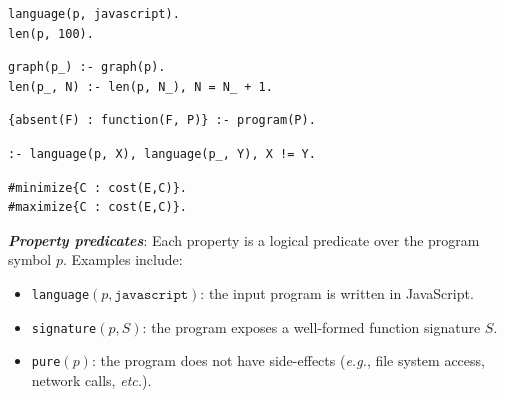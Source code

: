 \documentclass[nonacm,sigplan,review]{acmart}
\def\eg{{\em e.g.}, }
\def\etc{{\em etc.}\xspace}
\newcommand{\sys}{{\scshape Kv{\textalpha}sir}\xspace}
\newcommand{\heading}[1]{\vspace{2pt}\noindent\textbf{\emph{#1}}:\enspace}
\begin{document}
\begin{listing}
\begin{verbatim}
language(p, javascript).
len(p, 100).
\end{verbatim}
\caption{A set of facts over a program.}
\label{lst:terms}
\end{listing}

\begin{listing}
\begin{verbatim}
graph(p_) :- graph(p).
len(p_, N) :- len(p, N_), N = N_ + 1.
\end{verbatim}
\caption{Logic rules describing relationships between the original and regenerated program.}
\label{lst:rules}
\end{listing}

\begin{listing}
\begin{verbatim}
{absent(F) : function(F, P)} :- program(P).
\end{verbatim}
\caption{A choice rule.}
\label{lst:choice}
\end{listing}

\begin{listing}
\begin{verbatim}
:- language(p, X), language(p_, Y), X != Y.
\end{verbatim}
\caption{An integrity constraint.}
\label{lst:constraint}
\end{listing}

\begin{listing}
\begin{verbatim}
#minimize{C : cost(E,C)}.
#maximize{C : cost(E,C)}.
\end{verbatim}
\caption{Examples of optimization directives. Note that this differs from \sys's \texttt{\#min} or \texttt{\#max} directives, which is used to direct the synthesizer to minimize a property of the program but has no effect on the produced answer set.}
\label{lst:optimization}
\end{listing}




\heading{Property predicates}
Each property is a logical predicate over the program symbol $p$. Examples include:
\begin{itemize}
  \item \texttt{language}$(p, \texttt{javascript})$: the input program is written in JavaScript.
  \item \texttt{signature}$(p, S)$: the program exposes a well-formed function signature $S$.
  \item \texttt{pure}$(p)$: the program does not have side-effects (\eg file system access, network calls, \etc).
\end{itemize}
\end{document}
